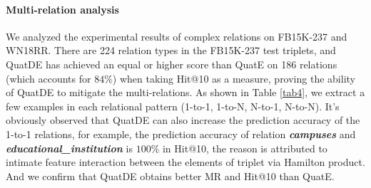 \documentclass[letterpaper]{article} \usepackage{aaai20}  \usepackage{times}  \usepackage{helvet} \usepackage{courier}  \usepackage[hyphens]{url}  \usepackage{graphicx} \usepackage{lineno,hyperref,amsmath,amssymb}
\begin{document}
\paragraph{\textbf{Multi-relation analysis}}We analyzed the experimental results of complex relations on FB15K-237 and WN18RR. There are 224 relation types in the FB15K-237 test triplets, and QuatDE has achieved an equal or higher score than QuatE on 186 relations (which accounts for $84\%$) when taking Hit@10 as a measure, proving the ability of QuatDE to mitigate the multi-relations. As shown in Table \ref{tab4}, we extract a few examples in each relational pattern (1-to-1, 1-to-N, N-to-1, N-to-N). It’s obviously observed that QuatDE can also increase the prediction accuracy of the 1-to-1 relations, for example, the prediction accuracy of relation \textbf{\textit{campuses}} and \textbf{\textit{educational\_institution}} is $100\%$ in Hit@10, the reason is attributed to intimate feature interaction between the elements of triplet via Hamilton product. And we confirm that QuatDE obtains better MR and Hit@10 than QuatE.
\end{document}
